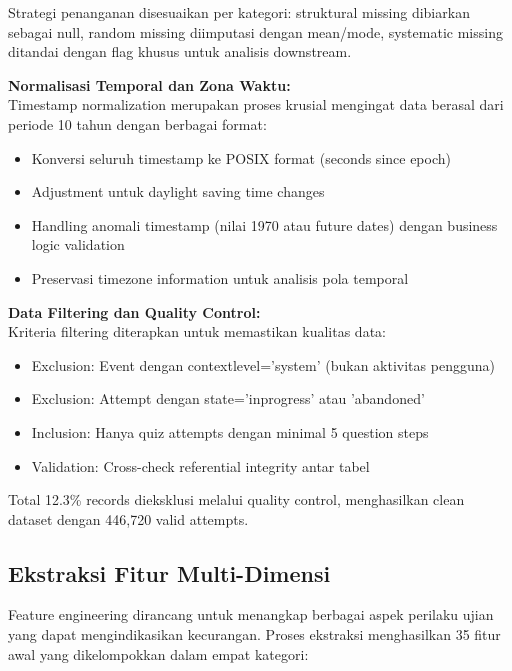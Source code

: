 Strategi penanganan disesuaikan per kategori: struktural missing dibiarkan sebagai null, random missing diimputasi dengan mean/mode, systematic missing ditandai dengan flag khusus untuk analisis downstream.

\textbf{Normalisasi Temporal dan Zona Waktu:} \\
Timestamp normalization merupakan proses krusial mengingat data berasal dari periode 10 tahun dengan berbagai format:
\begin{itemize}
    \item Konversi seluruh timestamp ke POSIX format (seconds since epoch)
    \item Adjustment untuk daylight saving time changes
    \item Handling anomali timestamp (nilai 1970 atau future dates) dengan business logic validation
    \item Preservasi timezone information untuk analisis pola temporal
\end{itemize}

\textbf{Data Filtering dan Quality Control:} \\
Kriteria filtering diterapkan untuk memastikan kualitas data:
\begin{itemize}
    \item Exclusion: Event dengan contextlevel='system' (bukan aktivitas pengguna)
    \item Exclusion: Attempt dengan state='inprogress' atau 'abandoned'
    \item Inclusion: Hanya quiz attempts dengan minimal 5 question steps
    \item Validation: Cross-check referential integrity antar tabel
\end{itemize}

Total 12.3\% records dieksklusi melalui quality control, menghasilkan clean dataset dengan 446,720 valid attempts.

\subsection{Ekstraksi Fitur Multi-Dimensi}
\label{sec:ekstraksiFiturMultiDimensi}

Feature engineering dirancang untuk menangkap berbagai aspek perilaku ujian yang dapat mengindikasikan kecurangan. Proses ekstraksi menghasilkan 35 fitur awal yang dikelompokkan dalam empat kategori:


